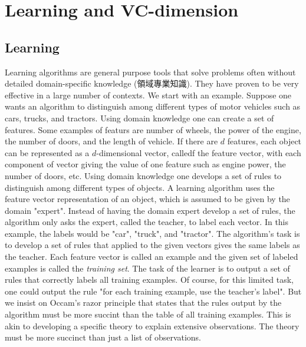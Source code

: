 \chapter{Learning and VC-dimension}

\section{Learning}
Learning algorithms are general purpose tools that solve problems often without detailed domain-specific knowledge (領域專業知識). They have proven to be very effective in a large number of contexts. We start with an example. Suppose one wants an algorithm to distinguish among different types of motor vehicles such as cars, trucks, and tractors. Using domain knowledge one can create a set of features. Some examples of featurs are number of wheels, the power of the engine, the number of doors, and the length of vehicle. If there are \(d\) features, each object can be represented as a \(d\)-dimensional vector, calledf the feature vector, with each component of vector giving the value of one feature such as engine power, the number of doors, etc. Using domain knowledge one develops a set of rules to distinguish among different types of objects. A learning algorithm uses the feature vector representation of an object, which is assumed to be given by the domain "expert". Instead of having the domain expert develop a set of rules, the algorithm only asks the expert, called the teacher, to label each vector. In this example, the labels would be "car", "truck", and "tractor". The algorithm's task is to develop a set of rules that applied to the given vectors gives the same labels as the teacher. Each feature vector is called an example and the given set of labeled examples is called the \textit{training set}. The task of the learner is to output a set of rules that correctly labels all training examples. Of course, for this limited task, one could output the rule "for each training example, use the teacher's label". But we insist on Occam's razor principle that states that the rules output by the algorithm must be more succint than the table of all training examples. This is akin to developing a specific theory to explain extensive observations. The theory must be more succinct than just a list of observations. 

